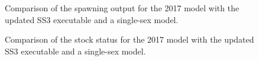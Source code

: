 \documentclass[
]{scrartcl}
\begin{document}
\section{}\label{section}

\begin{figure}


\caption{\label{fig-ss3exe_1}Comparison of the spawning output for the
2017 model with the updated SS3 executable and a single-sex model.}

\end{figure}%

\begin{figure}


\caption{\label{fig-ss3exe_2}Comparison of the stock status for the 2017
model with the updated SS3 executable and a single-sex model.}

\end{figure}%
\end{document}
